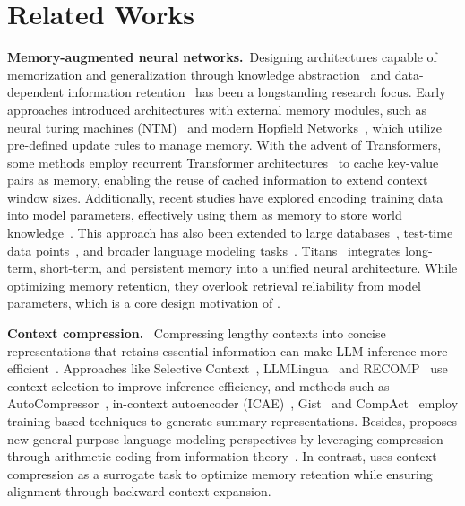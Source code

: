 \section{Related Works}
\label{sec:related works}

\noindent \textbf{Memory-augmented neural networks.}\ 
Designing architectures capable of memorization and generalization through knowledge abstraction~\citep{sukhbaatar2019augmenting} and data-dependent information retention~\citep{zancato2024b} has been a longstanding research focus. 
Early approaches introduced architectures with external memory modules, such as neural turing machines (NTM)~\citep{graves2014neural} and modern Hopfield Networks~\citep{ramsauer2020hopfield}, which utilize pre-defined update rules to manage memory. With the advent of Transformers, some methods employ recurrent Transformer architectures~\citep{dai2019transformer,bulatov2022recurrent} to cache key-value pairs as memory, enabling the reuse of cached information to extend context window sizes. 
Additionally, recent studies have explored encoding training data into model parameters, effectively using them as memory to store world knowledge~\citep{wang2024self,padmanabhan2024propagating,gangadhar-stratos-2024-model,he2024mixture}. This approach has also been extended to large databases~\citep{qian2024memorag}, test-time data points~\citep{sun2024learning}, and broader language modeling tasks~\citep{yang2024text}.
Titans~\citep{behrouz2024titans} integrates long-term, short-term, and persistent memory into a unified neural architecture.
While optimizing memory retention, they overlook retrieval reliability from model parameters, which is a core design motivation of \ourmethod{}.

\noindent \textbf{Context compression.}\ 
Compressing lengthy contexts into concise representations that retains essential information can make LLM inference more efficient~\citep{choi2022prompt,li2024prompt}.
Approaches like Selective Context~\citep{li-etal-2023-compressing}, LLMLingua~\citep{jiang-etal-2023-llmlingua,jiang-etal-2024-longllmlingua} and RECOMP~\citep{xu2023recomp} use context selection to improve inference efficiency, and methods such as AutoCompressor~\citep{chevalier-etal-2023-adapting}, in-context autoencoder (ICAE)~\citep{ge2023context}, Gist~\citep{mu2024learning} and CompAct~\citep{yoon-etal-2024-compact} employ training-based techniques to generate summary representations. 
Besides, \citet{deletang2023language} proposes new general-purpose language modeling perspectives by leveraging compression through arithmetic coding from information theory~\citep{rissanen1976generalized,pasco1976source}. 
In contrast, \ourmethod{} uses context compression as a surrogate task to optimize memory retention while ensuring alignment through backward context expansion.
